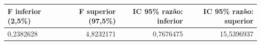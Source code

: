 \begin{tabular}{lrrr}
\toprule
F inferior (2,5\%) & F superior (97,5\%) & IC 95\% razão: inferior & IC 95\% razão: superior \\
\midrule
0,2382628 & 4,8232171 & 0,7676475 & 15,5396937 \\
\bottomrule
\end{tabular}
